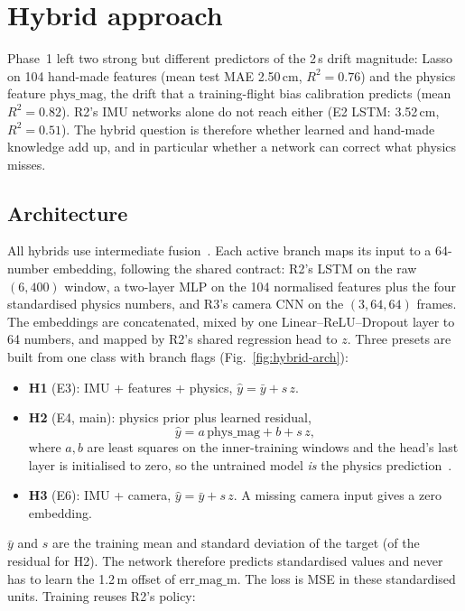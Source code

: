 \section{Hybrid approach}
\label{sec:hybrid}
Phase~1 left two strong but different predictors of the 2\,s drift
magnitude: Lasso on 104 hand-made features (mean test MAE 2.50\,cm,
$R^2=0.76$) and the physics feature $\mathrm{phys\_mag}$, the drift that a
training-flight bias calibration predicts (mean $R^2=0.82$). R2's IMU
networks alone do not reach either (E2 LSTM: 3.52\,cm, $R^2=0.51$). The
hybrid question is therefore whether learned and hand-made knowledge add up,
and in particular whether a network can correct what physics misses.

\subsection{Architecture}
All hybrids use intermediate fusion~\cite{r4baltrusaitis2019}. Each active
branch maps its input to a 64-number embedding, following the shared
contract: R2's LSTM on the raw $(6,400)$ window, a two-layer MLP on the 104
normalised features plus the four standardised physics numbers, and R3's
camera CNN on the $(3,64,64)$ frames. The embeddings are concatenated, mixed
by one Linear--ReLU--Dropout layer to 64 numbers, and mapped by R2's shared
regression head to $z$. Three presets are built from one class with branch
flags (Fig.~\ref{fig:hybrid-arch}):
\begin{itemize}
\item \textbf{H1} (E3): IMU + features + physics, $\hat y=\bar y+s\,z$.
\item \textbf{H2} (E4, main): physics prior plus learned residual,
  \begin{equation}
  \hat y = a\,\mathrm{phys\_mag} + b + s\,z ,
  \end{equation}
  where $a,b$ are least squares on the inner-training windows and the head's
  last layer is initialised to zero, so the untrained model \emph{is} the
  physics prediction~\cite{r4zeng2020,r4johannink2019}.
\item \textbf{H3} (E6): IMU + camera, $\hat y=\bar y+s\,z$. A missing camera
  input gives a zero embedding.
\end{itemize}
$\bar y$ and $s$ are the training mean and standard deviation of the target
(of the residual for H2). The network therefore predicts standardised
values and never has to learn the 1.2\,m offset of $\mathrm{err\_mag\_m}$.
The loss is MSE in these standardised units. Training reuses R2's policy:
